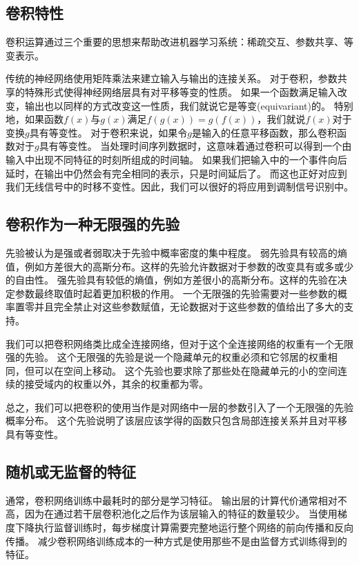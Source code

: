 \subsection{卷积特性}
卷积运算通过三个重要的思想来帮助改进机器学习系统：稀疏交互、参数共享、等变表示。

传统的神经网络使用矩阵乘法来建立输入与输出的连接关系。
对于卷积，参数共享的特殊形式使得神经网络层具有对平移等变的性质。
如果一个函数满足输入改变，输出也以同样的方式改变这一性质，我们就说它是等变(equivariant)的。
特别地，如果函数$f(x)$与$g(x)$满足$f(g(x))= g(f(x))$，我们就说$f(x)$对于变换$g$具有等变性。
对于卷积来说，如果令$g$是输入的任意平移函数，那么卷积函数对于$g$具有等变性。
当处理时间序列数据时，这意味着通过卷积可以得到一个由输入中出现不同特征的时刻所组成的时间轴。
如果我们把输入中的一个事件向后延时，在输出中仍然会有完全相同的表示，只是时间延后了。
而这也正好对应到我们无线信号中的时移不变性。因此，我们可以很好的将\label{con_net}应用到调制信号识别中。\par

\subsection{卷积作为一种无限强的先验}
先验被认为是强或者弱取决于先验中概率密度的集中程度。
弱先验具有较高的熵值，例如方差很大的高斯分布。这样的先验允许数据对于参数的改变具有或多或少的自由性。
强先验具有较低的熵值，例如方差很小的高斯分布。这样的先验在决定参数最终取值时起着更加积极的作用。
一个无限强的先验需要对一些参数的概率置零并且完全禁止对这些参数赋值，无论数据对于这些参数的值给出了多大的支持。\par

我们可以把卷积网络类比成全连接网络，但对于这个全连接网络的权重有一个无限强的先验。
这个无限强的先验是说一个隐藏单元的权重必须和它邻居的权重相同，但可以在空间上移动。
这个先验也要求除了那些处在隐藏单元的小的空间连续的接受域内的权重以外，其余的权重都为零。

总之，我们可以把卷积的使用当作是对网络中一层的参数引入了一个无限强的先验概率分布。
这个先验说明了该层应该学得的函数只包含局部连接关系并且对平移具有等变性。

\subsection{随机或无监督的特征}
\label{sec:random_or_unsupervised_features}

通常，卷积网络训练中最耗时的部分是学习特征。 
输出层的计算代价通常相对不高，因为在通过若干层卷积池化之后作为该层输入的特征的数量较少。
当使用梯度下降执行监督训练时，每步梯度计算需要完整地运行整个网络的前向传播和反向传播。
减少卷积网络训练成本的一种方式是使用那些不是由监督方式训练得到的特征。\par

